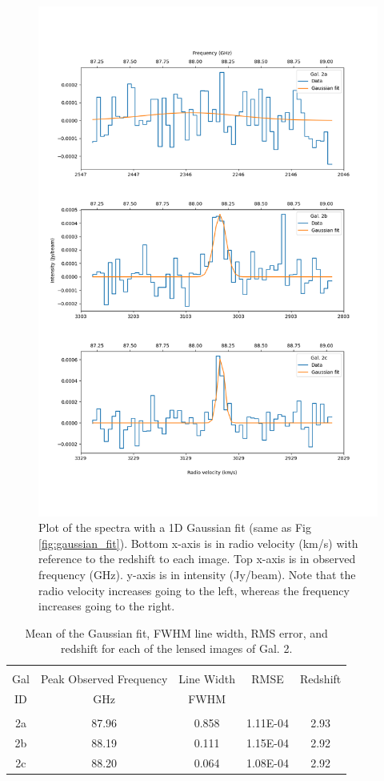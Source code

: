 \documentclass[11pt]{article}
\begin{document}
\begin{figure}[!htbp]
    \centering
    \includegraphics[width=0.8\linewidth]{../figs/redshift_axis_plot.png}
	\caption{Plot of the spectra with a 1D Gaussian fit (same as Fig \ref{fig:gaussian_fit}). Bottom x-axis is in radio velocity (km/s) with reference to the redshift to each image. Top x-axis is in observed frequency (GHz). y-axis is in intensity (Jy/beam). Note that the radio velocity increases going to the left, whereas the frequency increases going to the right.}
    \label{fig:redshift_axis}
\end{figure}

\begin{table}[!htbp]
\centering
\begin{tabular}{ccccc}
\hline \\[-0.25cm]
Gal & Peak Observed Frequency & Line Width & RMSE & Redshift \\
ID  & GHz                     & FWHM       &      & \\[0.1cm]
\hline \\[-0.25cm]
2a & 87.96 & 0.858 & 1.11E-04 & 2.93\\
2b & 88.19 & 0.111 & 1.15E-04 & 2.92\\
2c & 88.20 & 0.064 & 1.08E-04 & 2.92\\
\hline
\end{tabular}
\caption{Mean of the Gaussian fit, FWHM line width, RMS error, and redshift for each of the lensed images of Gal. 2.}
\label{table:peaks_zs}
\end{table}
\end{document}
